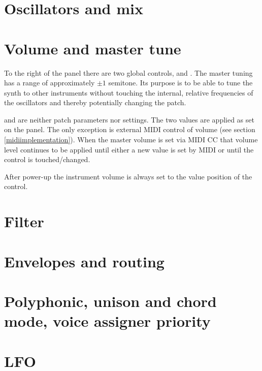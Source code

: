\documentclass[landscape, 11pt, oneside, twoside]{report}
\newenvironment{flowtext}{\addmargin[0cm]{0cm}}{\endaddmargin} %
\begin{document}
\begin{flowtext}


\section{Oscillators and mix}\label{osc}



\pagebreak

\section{Volume and master tune}

To the right of the panel there are two global controls, \mastertune and \mastervol. The master tuning has a range of approximately $\pm 1$ semitone. Its purpose is to be able to tune the synth to other instruments without touching the internal, relative frequencies of the oscillators and thereby potentially changing the patch.

\mastervol and \mastertune are neither patch parameters nor settings. The two values are applied as set on the panel. The only exception is external MIDI control of volume (see section \ref{midiimplementation}). When the master volume is set via MIDI CC that volume level continues to be applied until either a new value is set by MIDI or until the \mastervol control is touched/changed. 

After power-up the instrument volume is always set to the value position of the \mastervol control.

\section{Filter}\label{filter}



\section{Envelopes and routing}\label{envelopes}



\section{Polyphonic, unison and chord mode, voice assigner priority}\label{poly-unison-voice}



\section{LFO}\label{lfo}


\end{flowtext}
\end{document}
